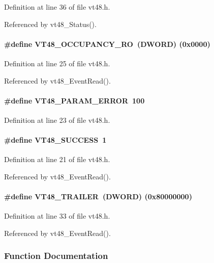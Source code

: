 Definition at line 36 of file vt48.h.

Referenced by vt48\_\-Status().
\paragraph[{VT48\_\-OCCUPANCY\_\-RO}]{\setlength{\rightskip}{0pt plus 5cm}\#define VT48\_\-OCCUPANCY\_\-RO~({\bf DWORD}) (0x0000)}\hfill\label{vt48_8h_ad8c2dc0161ef401ee0ef2c188bc83438}


Definition at line 25 of file vt48.h.

Referenced by vt48\_\-EventRead().
\paragraph[{VT48\_\-PARAM\_\-ERROR}]{\setlength{\rightskip}{0pt plus 5cm}\#define VT48\_\-PARAM\_\-ERROR~100}\hfill\label{vt48_8h_a016a27f720ca0705bb03517016409c4d}


Definition at line 23 of file vt48.h.
\paragraph[{VT48\_\-SUCCESS}]{\setlength{\rightskip}{0pt plus 5cm}\#define VT48\_\-SUCCESS~1}\hfill\label{vt48_8h_abaf3ebc35c582913599b403853583789}


Definition at line 21 of file vt48.h.

Referenced by vt48\_\-EventRead().
\paragraph[{VT48\_\-TRAILER}]{\setlength{\rightskip}{0pt plus 5cm}\#define VT48\_\-TRAILER~({\bf DWORD}) (0x80000000)}\hfill\label{vt48_8h_aa7737fe6d427ecc31d650b8e2c1035f0}


Definition at line 33 of file vt48.h.

Referenced by vt48\_\-EventRead().

\subsubsection{Function Documentation}
